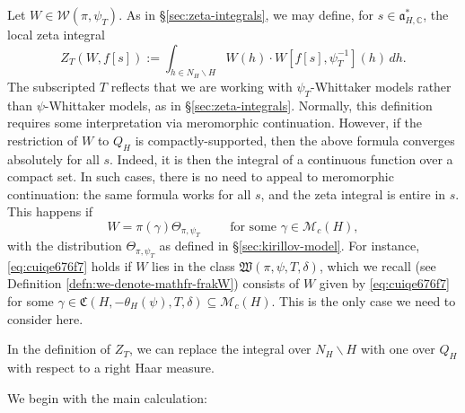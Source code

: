 Let $W \in \mathcal{W}(\pi,\psi_T)$.  As in \S\ref{sec:zeta-integrals}, we may define, for $s \in \mathfrak{a}_{H,\mathbb{C}}^*$, the local zeta integral
\begin{equation*}
  Z_T(W,f[s])
  :=
  \int_{h \in N_H \backslash H}
  W(h) \cdot W[f[s], \psi_T^{-1}](h) \, d h.
\end{equation*}
The subscripted $T$ reflects that we are working with $\psi_T$-Whittaker models rather than $\psi$-Whittaker models, as in \S\ref{sec:zeta-integrals}.  Normally, this definition requires some interpretation via meromorphic continuation.  However, if the restriction of $W$ to $Q_H$ is compactly-supported, then the above formula converges absolutely for all $s$.  Indeed, it is then the integral of a continuous function over a compact set.  In such cases, there is no need to appeal to meromorphic continuation: the same formula works for all $s$, and the zeta integral is entire in $s$.  This happens if
\begin{equation}\label{eq:cuiqe676f7}
  W = \pi(\gamma) \Theta_{\pi,\psi_T} \qquad \text{ for some } \gamma \in \mathcal{M}_c(H),
\end{equation}
with the distribution $\Theta_{\pi, \psi_T}$ as defined in \S\ref{sec:kirillov-model}.  For instance, \eqref{eq:cuiqe676f7} holds if $W$ lies in the class $\mathfrak{W}(\pi,\psi,T,\delta)$, which we recall (see Definition \ref{defn:we-denote-mathfr-frakW}) consists of $W$ given by \eqref{eq:cuiqe676f7} for some $\gamma \in \mathfrak{C}(H,-\theta_H(\psi),T,\delta) \subseteq \mathcal{M}_c(H)$.  This is the only case we need to consider here.

In the definition of $Z_T$, we can replace the integral over $N_H \backslash H$ with one over $Q_H$ with respect to a right Haar measure.


We begin with the main calculation:

